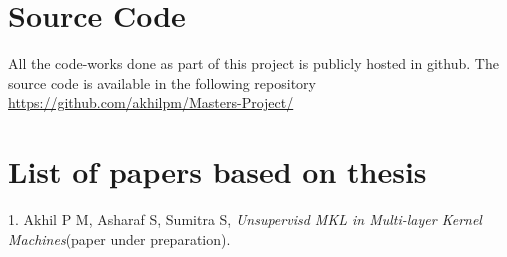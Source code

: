 \documentclass[a4paper, 12pt, oneside]{Thesis}  %
\begin{document}
\clearpage
{}
\section*{Source Code}
All the code-works done as part of this project is publicly hosted in github. The source code is available in the following repository\\
\url{https://github.com/akhilpm/Masters-Project/}
\vspace{4 em}
\section*{\bf List of papers based on thesis}

\vspace{5 mm}
1. Akhil P M, Asharaf S, Sumitra S, {\em Unsupervisd MKL in Multi-layer Kernel Machines}(paper under preparation).
\vspace{2 em}
\end{document}
